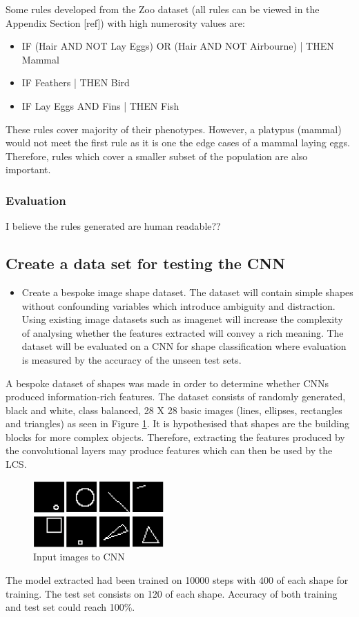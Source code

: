 Some rules developed from the Zoo dataset (all rules can be viewed in the Appendix Section [ref]) with high numerosity values are:
\begin{itemize}
	\item IF (Hair AND NOT Lay Eggs) OR (Hair AND NOT Airbourne) | THEN Mammal
	\item IF Feathers | THEN Bird
	\item IF Lay Eggs AND Fins | THEN Fish
\end{itemize}

These rules cover majority of their phenotypes. However, a platypus (mammal) would not meet the first rule as it is one the edge cases of a mammal laying eggs. Therefore, rules which cover a smaller subset of the population are also important. 

\subsubsection{Evaluation}
I believe the rules generated are human readable??

\subsection{Create a data set for testing the CNN}
\begin{itemize}
	\item Create a bespoke image shape dataset. The dataset will contain simple shapes without confounding variables which introduce ambiguity and distraction. Using existing image datasets such as imagenet \cite{imagenet} will increase the complexity of analysing whether the features extracted will convey a rich meaning. The dataset will be evaluated on a CNN for shape classification where evaluation is measured by the accuracy of the unseen test sets.
	
\end{itemize}
A bespoke dataset of shapes was made in order to determine whether CNNs produced information-rich features. The dataset consists of randomly generated, black and white, class balanced, 28 X 28 basic images (lines, ellipses, rectangles and triangles) as seen in Figure \ref{fig:inputShapes}. It is hypothesised that shapes are the building blocks for more complex objects. Therefore, extracting the features produced by the convolutional layers may produce features which can then be used by the LCS. 
\begin{figure}[H]
	\begin{center}
		\includegraphics[width=50mm, scale=0.9]{inputShapes.png}
		\caption{Input images to CNN}
		\label{fig:inputShapes}
	\end{center}
	
\end{figure}
The model extracted had been trained on 10000 steps with 400 of each shape for training. The test set consists on 120 of each shape. Accuracy of both training and test set could reach 100\%. 

